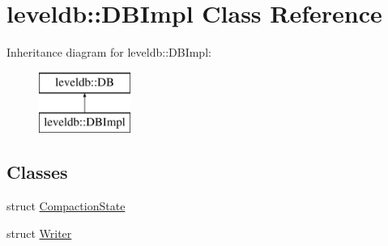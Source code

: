 \hypertarget{classleveldb_1_1_d_b_impl}{}\section{leveldb\+:\+:D\+B\+Impl Class Reference}
\label{classleveldb_1_1_d_b_impl}
Inheritance diagram for leveldb\+:\+:D\+B\+Impl\+:\begin{figure}[H]
\begin{center}
\leavevmode
\includegraphics[height=2.000000cm]{classleveldb_1_1_d_b_impl}
\end{center}
\end{figure}
\subsection*{Classes}
\begin{DoxyCompactItemize}
\item 
struct \mbox{\hyperlink{structleveldb_1_1_d_b_impl_1_1_compaction_state}{Compaction\+State}}
\item 
struct \mbox{\hyperlink{structleveldb_1_1_d_b_impl_1_1_writer}{Writer}}
\end{DoxyCompactItemize}
